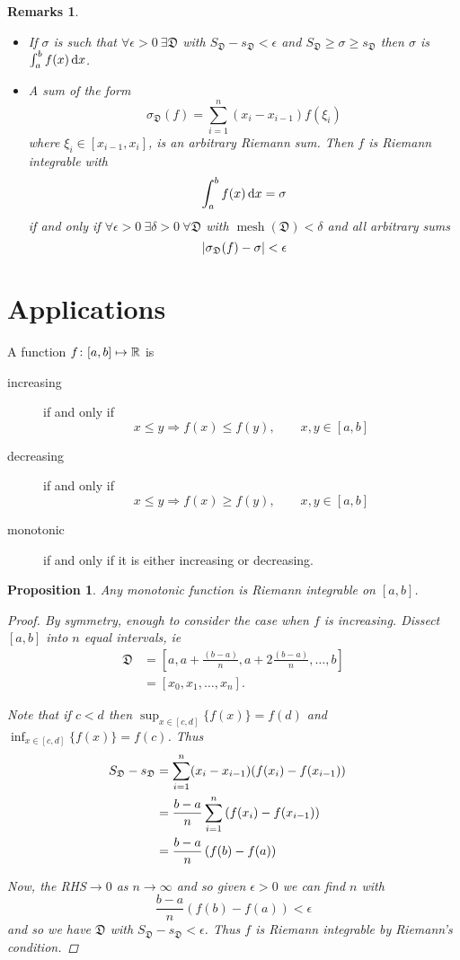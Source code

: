 \documentclass{notes}
\theoremstyle{plain}
\newtheorem{proposition}{Proposition}[chapter]
\newtheorem*{remarks}{Remarks}
\DeclareMathOperator{\mesh}{mesh}
\newcommand{\dis}{\mathfrak{D}}
\begin{document}
\begin{remarks}
\

\begin{itemize}
\item If $ \sigma $ is such that
$\forall\epsilon>0\ \exists\dis$ with
$S_{\dis}-s_{\dis}<\epsilon$ and $S_{\dis}\geq \sigma \geq s_{\dis}$
then $ \sigma $ is $ \int_{a}^{b}f(x)\,\mathrm{d} x $.

\item
A sum of the form
\[ \sigma_{\dis}(f) = \sum_{i=1}^{n}(x_{i}-x_{i-1})f(\xi_{i}) \]
where $ \xi_{i}\in [x_{i-1},x_{i}] $, is an \emph{arbitrary Riemann 
sum}.
Then $ f $ is Riemann integrable with
\[ \int_{a}^{b}f(x)\,\mathrm{d} x = \sigma \]
if and only if 
$\forall\epsilon>0\ \exists \delta>0\ \forall \dis$ with 
$\mesh(\dis)< \delta $ and all arbitrary sums \[ 
\abs{\sigma_{\dis}(f)-\sigma}<\epsilon \]
\end{itemize}
\end{remarks}

\section*{Applications}

A function $ f\colon [a,b] \mapsto \mathbb{R} $ is

\begin{description}
\item[increasing] if and only if
\[ x \leq y \Rightarrow f(x) \leq f(y),\qquad x,y \in [a,b]  \]
\item[decreasing] if and only if
\[ x \leq y \Rightarrow f(x) \geq f(y),\qquad x,y \in [a,b]  \]
\item[monotonic] if and only if it is either increasing or decreasing.
\end{description}

\begin{proposition}
Any monotonic function is Riemann integrable on $ [a,b] $.

\begin{proof}
By symmetry, enough to consider the case when $ f $ is increasing.
Dissect $ [a,b] $ into $ n $ equal intervals, ie
\begin{align*}
\dis & =  \left[a,a+ \frac{(b-a)}{n}, a + 2 \frac{(b-a)}{n},
\ldots, b\right] \\
& = [x_{0},x_{1},\ldots,x_{n}].
\end{align*}

Note that if $ c<d $ then $\sup_{x \in [c,d]}\{f(x)\}=f(d)$
and $\inf_{x \in [c,d]}\{f(x)\}=f(c)$.
Thus
\begin{align*}
S_{\dis}-s_{\dis} & = 
\sum_{i=1}^{n}(x_{i}-x_{i-1})(f(x_{i})-f(x_{i-1})) \cr
& = \frac{b-a}{n}\sum_{i=1}^{n}\left( f(x_{i})-f(x_{i-1}) \right) \cr
& = \frac{b-a}{n}\left( f(b)-f(a) \right)
\end{align*}

Now, the RHS$ \to 0 $ as $ n \to \infty $ and so
given $ \epsilon>0 $ we can find $ n $ with 
\[
\frac{b-a}{n} \left( f(b)-f(a) \right) < \epsilon
\]
and so we have $ \dis $ with $S_{\dis}-s_{\dis}<\epsilon$.
Thus $ f $ is Riemann integrable by Riemann's condition.
\end{proof}
\end{proposition}
\end{document}
